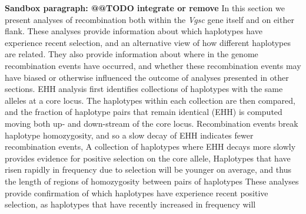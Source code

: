 \documentclass[a4paper,11pt,abstracton,hidelinks]{scrartcl}
\begin{document}
\textbf{Sandbox paragraph: @@TODO integrate or remove}
%
In this section we present analyses of recombination both within the \textit{Vgsc} gene itself and on either flank.
%
These analyses provide information about which haplotypes have experience recent selection, and an alternative view of how different haplotypes are related.
%
They also provide information about where in the genome recombination events have occurred, and whether these recombination events may have biased or otherwise influenced the outcome of analyses presented in other sections.
%
EHH analysis first identifies collections of haplotypes with the same alleles at a core locus.
%
The haplotypes within each collection are then compared, and the fraction of haplotype pairs that remain identical (EHH) is computed moving both up- and down-stream of the core locus.
%
Recombination events break haplotype homozygosity, and so a slow decay of EHH indicates fewer recombination events, 
%
A collection of haplotypes where EHH decays more slowly provides evidence for positive selection on the core allele, 
%
Haplotypes that have risen rapidly in frequency due to selection will be younger on average, and thus the length of regions of homozygosity between pairs of haplotypes 
%
These analyses provide confirmation of which haplotypes have experience recent positive selection, as haplotypes that have recently increased in frequency will 
\end{document}
